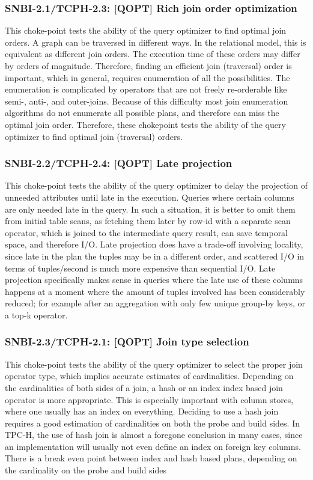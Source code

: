 \subsubsection{SNBI-2.1/TCPH-2.3: [QOPT]  Rich join order optimization}
\label{choke_point_2.1}
This choke-point tests the ability of the query optimizer to find optimal join orders. A graph can be traversed in different ways. In the relational model, this is equivalent as different join orders.
The execution time of these orders may differ by orders of magnitude. Therefore, finding an efficient join (traversal) order is important, which in general, requires enumeration of all the possibilities.
The enumeration is complicated by operators that are not freely re-orderable like semi-, \mbox{anti-,} and outer-joins. Because of this difficulty most join enumeration algorithms do not enumerate all possible plans, and therefore can miss the optimal join order. Therefore, these chokepoint tests the ability of the query optimizer to find optimal join (traversal) orders.

\subsubsection{SNBI-2.2/TCPH-2.4: [QOPT]  Late projection}
\label{choke_point_2.2}
This choke-point tests the ability of the query optimizer to delay the projection of unneeded attributes until late in the execution. Queries where certain columns are only needed late in the query.
In such a situation, it is better to omit them from initial table scans, as fetching them later by row-id with a separate scan operator, which is joined to the intermediate query result, can save temporal space, and therefore I/O.
Late projection does have a trade-off involving locality, since late in the plan the tuples may be in a different order, and scattered I/O in terms of tuples/second is much more expensive than sequential I/O.
Late projection specifically makes sense in queries where the late use of these columns happens at a moment where the amount of tuples involved has been considerably reduced;
for example after an aggregation with only few unique group-by keys, or a top-k operator.

\subsubsection{SNBI-2.3/TCPH-2.1: [QOPT]  Join type selection}
\label{choke_point_2.3}
This choke-point tests the ability of the query optimizer to select the proper join operator type, which implies accurate estimates of cardinalities.
Depending on the cardinalities of both sides of a join, a hash or an index index based join operator is more appropriate.
This is especially important with column stores, where one usually has an index on everything. Deciding to use a hash join requires a good estimation of cardinalities on both the probe and build sides.
In TPC-H, the use of hash join is almost a foregone conclusion in many cases, since an implementation will usually not even define an index on foreign key columns.
There is a break even point between index and hash based plans, depending on the cardinality on the probe and build sides

